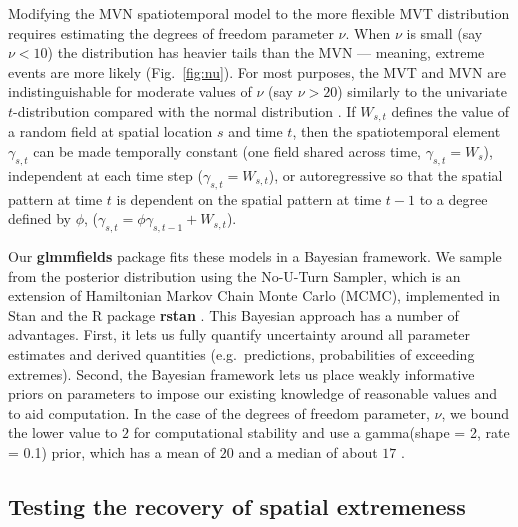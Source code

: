 \documentclass[12pt,english]{article}
\begin{document}
\begin{spacing}{1.8}
Modifying the MVN spatiotemporal model to the more flexible MVT distribution
requires estimating the degrees of freedom parameter $\nu$. When $\nu$ is small
(say $\nu < 10$) the distribution has heavier tails than the MVN
--- meaning, extreme events are more likely (Fig.~\ref{fig:nu}). For most
purposes, the MVT and MVN are indistinguishable for moderate values of $\nu$
(say $\nu > 20$) similarly to the univariate $t$-distribution compared with the
normal distribution \citep[e.g.][]{anderson2017}. If $W_{s,t}$
defines the value of a random field at spatial location $s$ and time $t$,
then the spatiotemporal element $\gamma_{s,t}$ can be
made temporally constant (one field shared across time, $\gamma_{s,t} = W_{s}$),
independent at each time step ($\gamma_{s,t} = W_{s,t}$), or autoregressive so
that the spatial pattern at time $t$ is dependent on the spatial pattern at time
$t-1$ to a degree defined by $\phi$, ($\gamma_{s,t} = \phi \gamma_{s,t-1} +
W_{s,t}$).

Our \textbf{glmmfields} package fits these models in a Bayesian framework. We
sample from the posterior distribution using the No-U-Turn Sampler, which is an
extension of Hamiltonian Markov Chain Monte Carlo (MCMC), implemented in Stan
\citep{standevelopmentteam2016a, carpenter2017} and the R package \textbf{rstan}
\citep{standevelopmentteam2016}. This Bayesian approach has a number of
advantages. First, it lets us fully quantify uncertainty around all parameter
estimates and derived quantities (e.g.\ predictions, probabilities of exceeding
extremes). Second, the Bayesian framework lets us place weakly informative
priors on parameters to impose our existing knowledge of reasonable values and
to aid computation. In the case of the degrees of freedom parameter, $\nu$, we
bound the lower value to $2$ for computational stability and use a gamma(shape = 2, rate = 0.1)
prior, which has a mean of $20$ and a median of
about $17$ \citep{juarez2010}.

\subsection{Testing the recovery of spatial extremeness}
\label{sec:testing-recovery}


\end{spacing}
\end{document}
